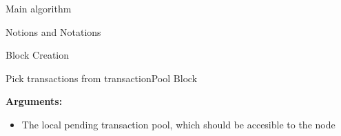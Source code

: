 \documentclass[10pt,a4paper]{article}
\begin{document}
\begin{section}{Main algorithm}
\begin{subsection}{Notions and Notations}
    


\end{subsection}

\begin{subsection}{Block Creation}\label{ssect:blockcreation}

\begin{algorithm}
    \begin{algorithmic}[1]
    \State Pick transactions from transactionPool
    \State \Return $\mathrm{Block}$    
    \EndFunction
    \end{algorithmic}
    \caption{\underline{Block creation}}
\end{algorithm}

\noindent \textbf{Arguments:}
\begin{itemize}
    \item The local pending transaction pool, which should be accesible to the node\\
  \end{itemize}


\end{subsection}
\end{section}
\end{document}
